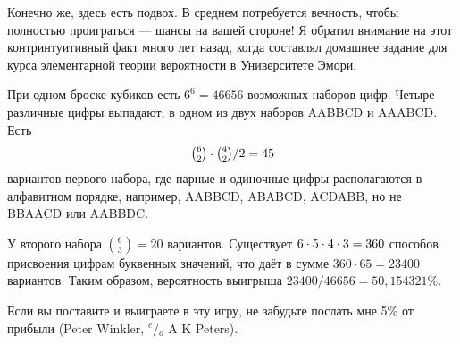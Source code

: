 Конечно же, здесь есть подвох.
В среднем потребуется вечность, чтобы полностью проиграться --- шансы на вашей стороне! 
Я обратил внимание на этот контринтуитивный факт много лет назад, когда составлял домашнее задание для курса элементарной теории вероятности в Университете Эмори.

При одном броске кубиков есть $6^6 =46656$ возможных наборов цифр.
Четыре различные цифры выпадают, в одном из двух наборов AABBCD и AAABCD.
Есть
\[\tbinom62\cdot\tbinom42/2=45\]
вариантов первого набора, где парные и одиночные цифры располагаются в алфавитном порядке, например, AABBCD, ABABCD, ACDABB, но не BBAACD или AABBDC.

У второго набора $\binom63=20$  вариантов.
Существует $6\cdot 5\cdot 4\cdot 3\z=360$ способов присвоения цифрам буквенных значений, что даёт в сумме $360\cdot 65=23400$ вариантов.
Таким образом, вероятность выигрыша
$23400/46656 = 50{,}154321\%$.
\heart

Если вы поставите и выиграете в эту игру, не забудьте послать мне 5\% от прибыли 
(Peter Winkler, ${^c\!/\!_o}$ A  K Peters).
